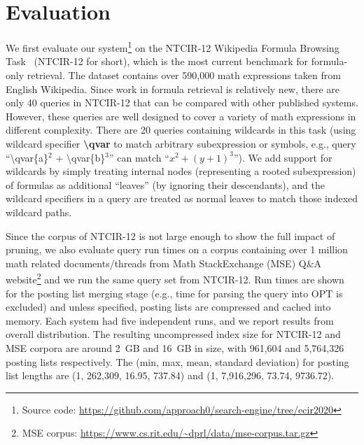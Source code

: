 \documentclass[runningheads]{llncs}
\begin{document}
\section{Evaluation}
We first evaluate our system\footnote{Source code: \url{https://github.com/approach0/search-engine/tree/ecir2020}} on the NTCIR-12 Wikipedia Formula Browsing Task~\cite{ntcir12} (NTCIR-12 for short), which is the most current benchmark for formula-only retrieval.
The dataset contains over 590,000 math expressions taken from English Wikipedia.
%
Since work in formula retrieval is relatively new, there are only 40 queries in NTCIR-12 that can be compared with other published systems. However, these queries are well designed to cover a variety of math expressions in different complexity.
There are 20 queries containing wildcards in this task (using wildcard specifier \textbf{\textbackslash{}qvar} to match arbitrary subexpression or symbols, e.g., query ``\textbackslash qvar\{a\}$^2$ + \textbackslash qvar\{b\}$^3$'' can match ``$x^2 + (y + 1)^3$'').
%
We add support for wildcards by simply treating internal nodes (representing a rooted subexpression) of formulas as additional ``leaves'' (by ignoring their descendants), and the wildcard specifiers in a query are treated as normal leaves to match those indexed wildcard paths.

Since the corpus of NTCIR-12 is not large enough to show the full impact of pruning, we also evaluate query run times on a corpus containing over 1 million math related documents/threads from Math StackExchange (MSE) Q\&A website\footnote{MSE corpus: \url{https://www.cs.rit.edu/~dprl/data/mse-corpus.tar.gz}} and we run the same query set from NTCIR-12.
%
Run times are shown for the posting list merging stage (e.g., time for parsing the query into OPT is excluded) and unless specified, posting lists are compressed and cached into memory.
%
Each system had five independent runs, and we report results from overall distribution.
%
The resulting uncompressed index size for NTCIR-12 and MSE corpora are
around 2~GB and 16~GB in size, with 961,604 and 5,764,326 posting lists respectively.
The (min, max, mean, standard deviation) for posting list lengths are (1, 262,309, 16.95, 737.84) and (1, 7,916,296, 73.74, 9736.72).
\end{document}
